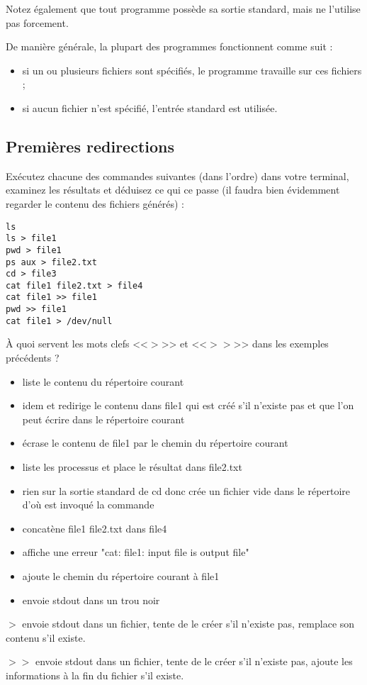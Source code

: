 \documentclass[11pt]{article}
\begin{document}
Notez également que tout programme possède sa sortie standard, mais ne l’utilise pas forcement.

De manière générale, la plupart des programmes fonctionnent comme suit :

\begin{itemize}
 \item si un ou plusieurs fichiers sont spécifiés, le programme travaille sur ces fichiers ;
 \item si aucun fichier n'est spécifié, l'entrée standard est utilisée.
\end{itemize}

\subsection{Premières redirections}

Exécutez chacune des commandes suivantes (dans l’ordre) dans votre terminal, examinez les résultats et déduisez ce qui ce passe
(il faudra bien évidemment regarder le contenu des fichiers générés) :

\begin{lstlisting}
ls
ls > file1
pwd > file1
ps aux > file2.txt
cd > file3
cat file1 file2.txt > file4
cat file1 >> file1
pwd >> file1
cat file1 > /dev/null
\end{lstlisting}

À quoi servent les mots clefs <<$>$>> et <<$>>$>> dans les exemples précédents ?

\begin{solution}
 \begin{itemize}
  \item liste le contenu du répertoire courant
  \item idem et redirige le contenu dans file1 qui est créé s'il n'existe pas et que l'on peut écrire dans le répertoire courant
  \item écrase le contenu de file1 par le chemin du répertoire courant
  \item liste les processus et place le résultat dans file2.txt
  \item rien sur la sortie standard de cd donc crée un fichier vide dans le répertoire d'où est invoqué la commande
  \item concatène file1 file2.txt dans file4
  \item affiche une erreur "cat: file1: input file is output file"
  \item ajoute le chemin du répertoire courant à file1
  \item envoie stdout dans un trou noir
 \end{itemize}

 $>$ envoie stdout dans un fichier, tente de le créer s'il n'existe pas, remplace son contenu s'il existe.

 $>>$ envoie stdout dans un fichier, tente de le créer s'il n'existe pas, ajoute les informations à la fin du fichier s'il existe.

\end{solution}
\end{document}
